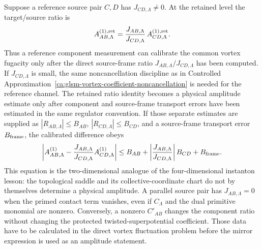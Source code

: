 \begin{remark}
Suppose a reference source pair \(C,D\) has
\(J_{CD,\Lambda}\neq0\).  At the retained level the target/source ratio is
\begin{equation}
  A^{(1),{\rm ret}}_{AB,\Lambda}
  =
  \frac{J_{AB,\Lambda}}{J_{CD,\Lambda}}\,
  A^{(1),{\rm ret}}_{CD,\Lambda}.
  \label{eq:glsm-one-vortex-source-frame-ratio}
\end{equation}
Thus a reference component measurement can calibrate the common vortex
fugacity only after the direct source-frame ratio
\(J_{AB,\Lambda}/J_{CD,\Lambda}\) has been computed.  If
\(J_{CD,\Lambda}\) is small, the same noncancellation discipline as in
Controlled Approximation~\ref{ca:glsm-vortex-coefficient-noncancellation} is
needed for the reference channel.  The retained ratio identity becomes a
physical amplitude estimate only after component and source-frame transport
errors have been estimated in the same regulator convention.  If those
separate estimates are supplied as
\(|R_{AB,\Lambda}|\le B_{AB}\), \(|R_{CD,\Lambda}|\le B_{CD}\), and a
source-frame transport error \(B_{\rm frame}\), the calibrated difference
obeys
\begin{equation}
  \left|
    A^{(1)}_{AB,\Lambda}
    -
    \frac{J_{AB,\Lambda}}{J_{CD,\Lambda}}
    A^{(1)}_{CD,\Lambda}
  \right|
  \le
  B_{AB}
  +
  \left|\frac{J_{AB,\Lambda}}{J_{CD,\Lambda}}\right|B_{CD}
  +
  B_{\rm frame}.
  \label{eq:glsm-one-vortex-source-frame-calibration-bound}
\end{equation}
This equation is the two-dimensional analogue of the four-dimensional
instanton lesson: the topological saddle and its collective-coordinate chart
do not by themselves determine a physical amplitude.  A parallel source pair
has \(J_{AB,\Lambda}=0\) when the primed contact term vanishes, even if
\(C_\Lambda\) and the dual primitive monomial are nonzero.  Conversely, a
nonzero \(C'_{AB}\) changes the component ratio without changing the protected
twisted-superpotential coefficient.  Those data have to be calculated in the
direct vortex fluctuation problem before the mirror expression is used as an
amplitude statement.
\end{remark}

